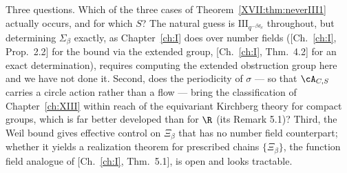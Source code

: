 Three questions. Which of the three cases of Theorem~\ref{XVII:thm:neverIII1} actually occurs, and
for which $S$? The natural guess is $\mathrm{III}_{q^{-\beta d_S}}$ throughout, but
determining $\Sigma_\beta$ exactly, as Chapter~\ref{ch:I} does over number fields
([Ch.~\ref{ch:I}, Prop.~2.2] for the bound via the extended group, [Ch.~\ref{ch:I}, Thm.~4.2]
for an exact determination), requires computing the extended obstruction group here and we
have not done it. Second, does the periodicity of $\sigma$ --- so that $\cA_{C,S}$ carries a
circle action rather than a flow --- bring the classification of Chapter~\ref{ch:XIII} within reach of
the equivariant Kirchberg theory for compact groups, which is far better developed than for
$\R$ (its Remark 5.1)? Third, the Weil bound gives effective control on
$\Xi_\beta$ that has no number field counterpart; whether it yields a realization theorem for
prescribed chains $\{\Xi_\beta\}$, the function field analogue of
[Ch.~\ref{ch:I}, Thm.~5.1], is open and looks tractable.

